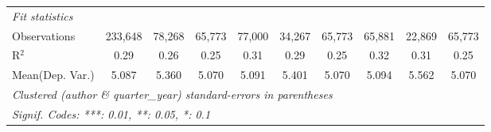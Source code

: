 \begin{tabular}{lccccccccc}
   \midrule
   \emph{Fit statistics}\\
   Observations                           & 233,648       & 78,268        & 65,773        & 77,000        & 34,267        & 65,773        & 65,881        & 22,869  & 65,773\\  
   R$^2$                                  & 0.29          & 0.26          & 0.25          & 0.31          & 0.29          & 0.25          & 0.32          & 0.31    & 0.25\\  
Mean(Dep. Var.) & 5.087 & 5.360 & 5.070 & 5.091 & 5.401 & 5.070 & 5.094 & 5.562 & 5.070 \\
   \midrule \midrule
   \multicolumn{10}{l}{\emph{Clustered (author \& quarter\_year) standard-errors in parentheses}}\\
   \multicolumn{10}{l}{\emph{Signif. Codes: ***: 0.01, **: 0.05, *: 0.1}}\\
\end{tabular}
\par\endgroup
